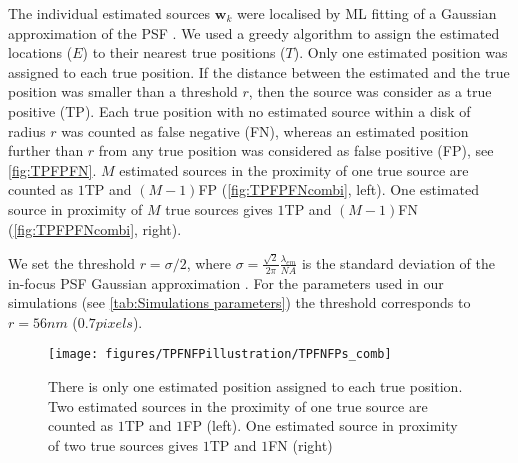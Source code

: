 The individual estimated sources $\bm{w}_k$ were localised by ML fitting of a Gaussian approximation of the PSF \cite{Zhang2007}. We used a greedy algorithm to assign the estimated locations ($E$) to their nearest true positions ($T$). Only one estimated position was assigned to each true position. If the distance between the estimated and the true position was smaller than a threshold $r$, then the source was consider as a true positive (TP). Each true position with no estimated source within a disk of radius $r$ was counted as false negative (FN), whereas an estimated position further than $r$ from any true position was considered as false positive (FP), see \autoref{fig:TPFPFN}. $M$ estimated sources in the proximity of one true source are counted as $1$TP and $(M-1)$FP (\autoref{fig:TPFPFNcombi}, left). One estimated source in proximity of $M$ true sources gives $1$TP and $(M-1)$FN (\autoref{fig:TPFPFNcombi}, right).

We set the threshold $r=\sigma/2$, where $\sigma=\frac{\sqrt{2}}{2\pi}\frac{\lambda_{em}}{NA}$ is the standard deviation of the in-focus PSF Gaussian approximation \cite{Zhang2007}. For the parameters used in our simulations (see \autoref{tab:Simulations parameters}) the threshold corresponds to $r=56\unit{nm}$ ($0.7\unit{pixels}$). 

\begin{figure}[!tb]
	\centering
	\texttt{[image: figures/TPFNFPillustration/TPFNFPs\_comb]}
	\caption{There is only one estimated position assigned to each true position. Two estimated sources in the proximity of one true source are counted as $1$TP and $1$FP (left). One estimated source in proximity of two true sources gives $1$TP and $1$FN (right)}
	\label{fig:TPFPFNcombi}
\end{figure}


